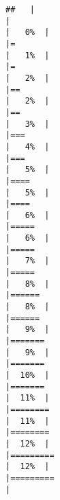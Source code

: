 \documentclass[
]{book}
\begin{document}
\begin{verbatim}
##   |                                                                              |                                                                      |   0%  |                                                                              |=                                                                     |   1%  |                                                                              |=                                                                     |   2%  |                                                                              |==                                                                    |   2%  |                                                                              |==                                                                    |   3%  |                                                                              |===                                                                   |   4%  |                                                                              |===                                                                   |   5%  |                                                                              |====                                                                  |   5%  |                                                                              |====                                                                  |   6%  |                                                                              |=====                                                                 |   6%  |                                                                              |=====                                                                 |   7%  |                                                                              |=====                                                                 |   8%  |                                                                              |======                                                                |   8%  |                                                                              |======                                                                |   9%  |                                                                              |=======                                                               |   9%  |                                                                              |=======                                                               |  10%  |                                                                              |=======                                                               |  11%  |                                                                              |========                                                              |  11%  |                                                                              |========                                                              |  12%  |                                                                              |=========                                                             |  12%  |                                                                              |=========                                                             |  
\end{verbatim}
\end{document}
